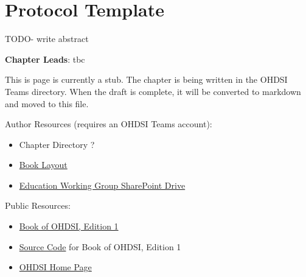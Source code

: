 \documentclass[
  letterpaper,
  paper=7in:10in,
  pagesize=pdftex,
  headinclude=on,
  footinclude=on,
  12pt]{scrbook}
\providecommand{\tightlist}{%
  \setlength{\itemsep}{0pt}\setlength{\parskip}{0pt}}\usepackage{longtable,booktabs,array}
\begin{document}
\chapter*{Protocol Template}\label{sec-appendix-protocol}


TODO- write abstract

\hfill\break

\textbf{Chapter Leads}: tbc

\begin{tcolorbox}[enhanced jigsaw, opacitybacktitle=0.6, coltitle=black, colback=white, bottomrule=.15mm, bottomtitle=1mm, title=\textcolor{quarto-callout-note-color}{\faInfo}\hspace{0.5em}{Note}, titlerule=0mm, rightrule=.15mm, colbacktitle=quarto-callout-note-color!10!white, colframe=quarto-callout-note-color-frame, toptitle=1mm, arc=.35mm, left=2mm, breakable, opacityback=0, leftrule=.75mm, toprule=.15mm]

This is page is currently a stub. The chapter is being written in the
OHDSI Teams directory. When the draft is complete, it will be converted
to markdown and moved to this file.

Author Resources (requires an OHDSI Teams account):

\begin{itemize}
\tightlist
\item
  Chapter Directory ?
\item
  \href{https://ohdsiorg.sharepoint.com/:x:/r/sites/Workgroup-EducationWorkingGroup/_layouts/15/Doc2.aspx?action=edit&sourcedoc=\%7B1fa31e39-1c5f-4918-b878-609ebd9810b3\%7D&wdOrigin=TEAMS-WEB.teamsSdk_ns.rwc&wdExp=TEAMS-TREATMENT&wdhostclicktime=1748104477731&web=1}{Book
  Layout}
\item
  \href{https://ohdsiorg.sharepoint.com/sites/Workgroup-EducationWorkingGroup/Shared\%20Documents/Forms/AllItems.aspx?viewid=05fec2cc\%2Dec8a\%2D4d04\%2Db565\%2Dcf1289b96f67}{Education
  Working Group SharePoint Drive}
\end{itemize}

Public Resources:

\begin{itemize}
\tightlist
\item
  \href{https://ohdsi.github.io/TheBookOfOhdsi/}{Book of OHDSI, Edition
  1}
\item
  \href{https://github.com/OHDSI/TheBookOfOhdsi}{Source Code} for Book
  of OHDSI, Edition 1
\item
  \href{https://ohdsi.org/}{OHDSI Home Page}
\end{itemize}

\end{tcolorbox}


\backmatter
\end{document}
